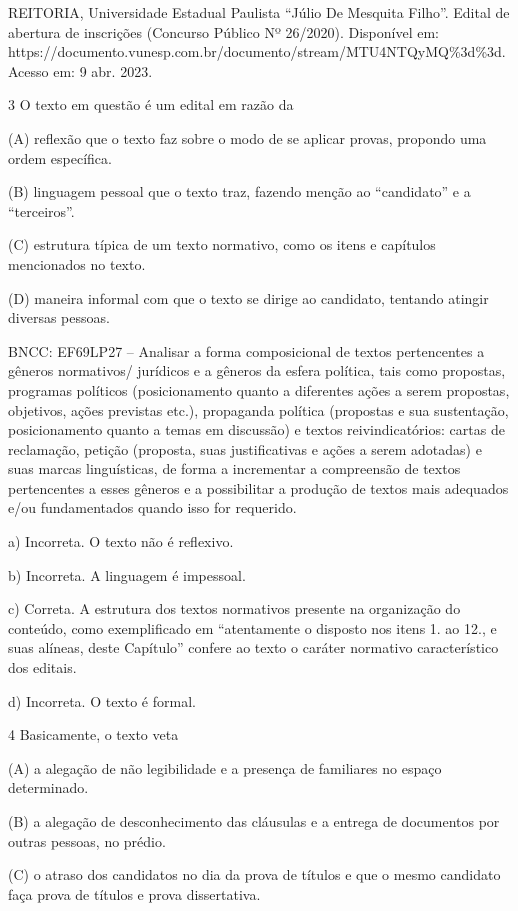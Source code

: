 \begin{itemize}
\begin{itemize}
\begin{escolha}
\begin{escolha}
\begin{escolha}
\begin{escolha}
\begin{escolha}
REITORIA, Universidade Estadual Paulista ``Júlio De Mesquita Filho''.
Edital de abertura de inscrições (Concurso Público Nº 26/2020).
Disponível em:
https://documento.vunesp.com.br/documento/stream/MTU4NTQyMQ\%3d\%3d.
Acesso em: 9 abr. 2023.

\num{3} O texto em questão é um edital em razão da

(A) reflexão que o texto faz sobre o modo de se aplicar provas, propondo
uma ordem específica.

(B) linguagem pessoal que o texto traz, fazendo menção ao ``candidato''
e a ``terceiros''.

(C) estrutura típica de um texto normativo, como os itens e capítulos
mencionados no texto.

(D) maneira informal com que o texto se dirige ao candidato, tentando
atingir diversas pessoas.

BNCC: EF69LP27 -- Analisar a forma composicional de textos pertencentes
a gêneros normativos/ jurídicos e a gêneros da esfera política, tais
como propostas, programas políticos (posicionamento quanto a diferentes
ações a serem propostas, objetivos, ações previstas etc.), propaganda
política (propostas e sua sustentação, posicionamento quanto a temas em
discussão) e textos reivindicatórios: cartas de reclamação, petição
(proposta, suas justificativas e ações a serem adotadas) e suas marcas
linguísticas, de forma a incrementar a compreensão de textos
pertencentes a esses gêneros e a possibilitar a produção de textos mais
adequados e/ou fundamentados quando isso for requerido.

a) Incorreta. O texto não é reflexivo.

b) Incorreta. A linguagem é impessoal.

c) Correta. A estrutura dos textos normativos presente na organização do
conteúdo, como exemplificado em ``atentamente o disposto nos itens 1. ao
12., e suas alíneas, deste Capítulo'' confere ao texto o caráter
normativo característico dos editais.

d) Incorreta. O texto é formal.

\num{4} Basicamente, o texto veta

(A) a alegação de não legibilidade e a presença de familiares no espaço
determinado.

(B) a alegação de desconhecimento das cláusulas e a entrega de
documentos por outras pessoas, no prédio.

(C) o atraso dos candidatos no dia da prova de títulos e que o mesmo
candidato faça prova de títulos e prova dissertativa.


\end{escolha}
\end{escolha}
\end{escolha}
\end{escolha}
\end{escolha}
\end{itemize}
\end{itemize}
